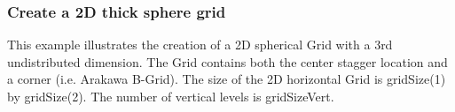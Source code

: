  
\setlength{\oldparskip}{\parskip}
\setlength{\parskip}{1.5ex}
\setlength{\oldparindent}{\parindent}
\setlength{\parindent}{0pt}
\setlength{\oldbaselineskip}{\baselineskip}
\setlength{\baselineskip}{11pt}
 
\def\bv{\begin{verbatim}}
\def\ev{\end{verbatim}}
\def\be{\begin{equation}}
\def\ee{\end{equation}}
\def\bea{\begin{eqnarray}}
\def\eea{\end{eqnarray}}
\def\bi{\begin{itemize}}
\def\ei{\end{itemize}}
\def\bn{\begin{enumerate}}
\def\en{\end{enumerate}}
\def\bd{\begin{description}}
\def\ed{\end{description}}
\def\({\left (}
\def\){\right )}
\def\[{\left [}
\def\]{\right ]}
\def\<{\left  \langle}
\def\>{\right \rangle}
\def\cI{{\cal I}}
\def\diag{\mathop{\rm diag}}
\def\tr{\mathop{\rm tr}}


 

   \subsubsection{Create a 2D thick sphere grid}
  
   This example  illustrates the creation of a 2D spherical Grid 
   with a 3rd undistributed dimension.  The Grid contains both the center stagger location and a corner
   (i.e. Arakawa B-Grid). The size of the 2D horizontal Grid is gridSize(1) by gridSize(2). The number of
   vertical levels is gridSizeVert. 

